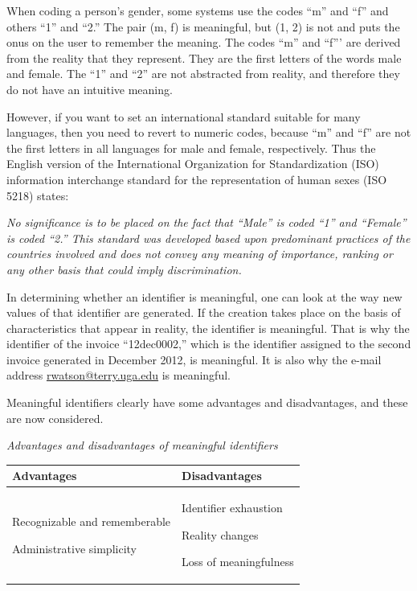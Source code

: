\documentclass[
]{article}
\begin{document}
When coding a person's gender, some systems use the codes ``m'' and ``f''
and others ``1'' and ``2.'' The pair (m, f) is meaningful, but (1, 2) is not
and puts the onus on the user to remember the meaning. The codes ``m'' and
``f''' are derived from the reality that they represent. They are the
first letters of the words male and female. The ``1'' and ``2'' are not
abstracted from reality, and therefore they do not have an intuitive
meaning.

However, if you want to set an international standard suitable for many
languages, then you need to revert to numeric codes, because ``m'' and ``f''
are not the first letters in all languages for male and female,
respectively. Thus the English version of the International Organization
for Standardization (ISO) information interchange standard for the
representation of human sexes (ISO 5218) states:

\emph{No significance is to be placed on the fact that ``Male'' is coded ``1''
and ``Female'' is coded ``2.'' This standard was developed based upon
predominant practices of the countries involved and does not convey any
meaning of importance, ranking or any other basis that could imply
discrimination.}

In determining whether an identifier is meaningful, one can look at the
way new values of that identifier are generated. If the creation takes
place on the basis of characteristics that appear in reality, the
identifier is meaningful. That is why the identifier of the invoice
``12dec0002,'' which is the identifier assigned to the second invoice
generated in December 2012, is meaningful. It is also why the e-mail
address \href{mailto:rwatson@terry.uga.edu}{\underline{rwatson@terry.uga.edu}} is
meaningful.

Meaningful identifiers clearly have some advantages and disadvantages,
and these are now considered.

\emph{Advantages and disadvantages of meaningful identifiers}

\begin{longtable}[]{@{}
  >{\raggedright\arraybackslash}p{}
  >{\raggedright\arraybackslash}p{}@{}}
\toprule
Advantages & Disadvantages \\
\midrule
\endhead
Recognizable and
rememberable

Administrative simplicity & Identifier exhaustion

Reality changes

Loss of
meaningfulness \\
\bottomrule
\end{longtable}
\end{document}
